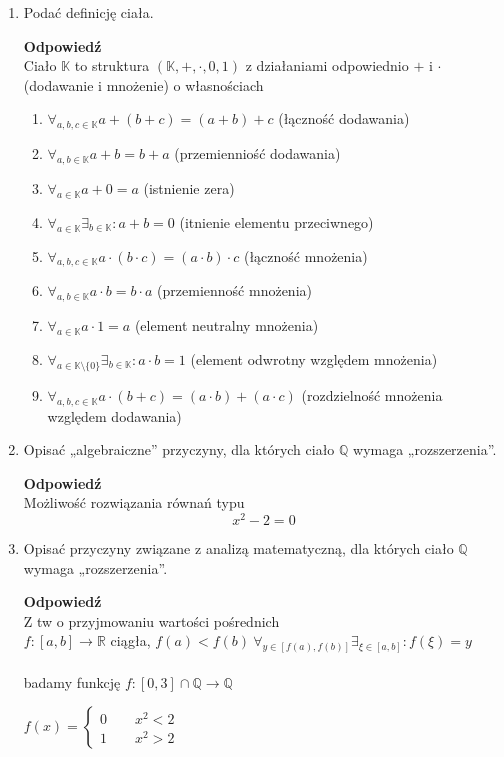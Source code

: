 \documentclass[12pt,a4paper]{article}
\theoremstyle{break}
\newcommand{\Odp}[1]{
		\begin{mdframed}[style=zadanie]
			\textbf{Odpowiedź}\\
			#1
		\end{mdframed}
	}
\newcommand{\UkladRownan}[2]{
	\left\{
	\begin{array}{l}
		#1 \\
		#2
	\end{array}
	\right.
}
\begin{document}
\begin{enumerate}[1.]
{\begin{enumerate}[1$^\circ$]
		\end{enumerate}
	}
	\newpage
	\item Podać definicję ciała.
	\Odp{
		Ciało $\mathbb{K}$ to struktura $(\mathbb{K},+,\cdot,0,1)$ z działaniami odpowiednio $+$ i $\cdot$ (dodawanie i mnożenie) o własnościach 
		\begin{enumerate}[1)]
			\item $\forall_{a,b,c\in \mathbb{K}} a+(b+c)=(a+b)+c$ (łączność dodawania)
			\item $\forall_{a,b\in \mathbb{K}} a+b = b+a$ (przemienniość dodawania)
			\item $\forall_{a\in \mathbb{K}} a+0=a$ (istnienie zera)
			\item $\forall_{a\in\mathbb{K}} \exists_{b\in \mathbb{K}} : a+b=0$ (itnienie elementu przeciwnego)
			\item $\forall_{a,b,c\in \mathbb{K}} a\cdot (b\cdot c) = (a\cdot b)\cdot c$ (łączność mnożenia)
			\item $\forall_{a,b\in\mathbb{K}} a\cdot b=b\cdot a$ (przemienność mnożenia)
			\item $\forall_{a\in\mathbb{K}} a\cdot 1 = a$ (element neutralny mnożenia)
			\item $\forall_{a\in\mathbb{K}\setminus \{0\}} \exists_{b\in\mathbb{K}}: a\cdot b = 1$ (element odwrotny względem mnożenia)
			\item $\forall_{a,b,c\in\mathbb{K}} a\cdot(b+c)=(a\cdot b)+(a\cdot c)$ (rozdzielność mnożenia względem dodawania)
		\end{enumerate}
	}
	
	\item Opisać „algebraiczne” przyczyny, dla których ciało $\mathbb{Q}$ wymaga „rozszerzenia”.
	\Odp{
		Możliwość rozwiązania równań typu
		$$x^2-2=0$$
	}
	
	\item Opisać przyczyny związane z analizą matematyczną, dla których ciało $\mathbb{Q}$ wymaga „rozszerzenia”.
	\Odp{
		Z tw o przyjmowaniu wartości pośrednich\\
 		$f: [a,b] \rightarrow \mathbb{R}$ ciągła, $f(a)<f(b) \: \forall_{y\in [f(a),f(b)]} \exists_{\xi \in [a,b]}: f(\xi)=y$\\\\ 
 		badamy funkcję $f: [0,3]\cap \mathbb{Q} \rightarrow \mathbb{Q}$
 		
 		$f(x)=\UkladRownan{0 \qquad x^2<2}{1 \qquad x^2>2}$
	}
	

\end{enumerate}
\end{document}
